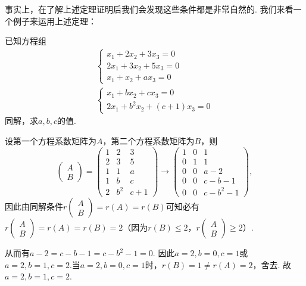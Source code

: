 事实上，在了解上述定理证明后我们会发现这些条件都是非常自然的. 我们来看一个例子来运用上述定理：
\begin{example}
    已知方程组\begin{gather*}
        \begin{cases}
            x_1+2x_2+3x_3=0  \\
            2x_1+3x_2+5x_3=0 \\
            x_1+x_2+ax_3=0
        \end{cases} \\
        \begin{cases}
            x_1+bx_2+cx_3=0 \\
            2x_1+b^2x_2+(c+1)x_3=0
        \end{cases}
    \end{gather*}
    同解，求$a,b,c$的值.
\end{example}
\begin{solution}
    设第一个方程系数矩阵为$A$，第二个方程系数矩阵为$B$，则
    \[\begin{pmatrix}
        A \\ B
    \end{pmatrix}=\begin{pmatrix}
        1 & 2 & 3 \\ 2 & 3 & 5 \\ 1 & 1 & a \\ 1 & b & c \\ 2 & b^2 & c+1
    \end{pmatrix}\to\begin{pmatrix}
        1 & 0 & 1 \\ 0 & 1 & 1 \\ 0 & 0 & a-2 \\ 0 & 0 & c-b-1 \\ 0 & 0 & c-b^2-1
    \end{pmatrix},\]
    因此由同解条件$r\begin{pmatrix}
        A \\ B
    \end{pmatrix}=r(A)=r(B)$可知必有$r\begin{pmatrix}
        A \\ B
    \end{pmatrix}=r(A)=r(B)=2$（因为$r(B)\leqslant 2$，$r\begin{pmatrix}
        A \\ B
    \end{pmatrix}\geqslant 2$）.

    从而有$a-2=c-b-1=c-b^2-1=0$. 因此$a=2,b=0,c=1$或$a=2,b=1,c=2$.当$a=2,b=0,c=1$时，$r(B)=1\neq r(A)=2$，舍去. 故$a=2,b=1,c=2$.
\end{solution}

